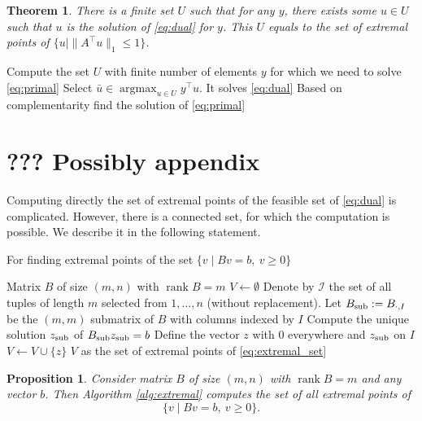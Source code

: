 \documentclass[journal]{IEEEtranTIE}
\newtheorem{theorem}[thm]{Theorem}
\newtheorem{proposition}[thm]{Proposition}
\theoremstyle{definition}
\newcommand{\argmax}{\operatorname{argmax}}
\newcommand{\norm}[1]{\|#1\|}
\newcommand{\rank}{\operatorname{rank}}
\begin{document}
\begin{theorem}
  There is a finite set $U$ such that for any $y$, there exists some $u\in U$ such that $u$ is the solution of \eqref{eq:dual} for $y$. This $U$ equals to the set of extremal points of $\{u\mid \norm{A^\top u}_1\le 1\}$.
\end{theorem}


\begin{algorithm}
\begin{algorithmic}[1]
  \Offline Compute the set $U$ with finite number of elements
  \Require $y$ for which we need to solve \eqref{eq:primal}
  \State Select $\bar u \in \argmax_{u\in U}y^\top u$. It solves \eqref{eq:dual}
  \State Based on complementarity find the solution of \eqref{eq:primal}
\end{algorithmic}
\end{algorithm}

\section{??? Possibly appendix}

Computing directly the set of extremal points of the feasible set of \eqref{eq:dual} is complicated. However, there is a connected set, for which the computation is possible. We describe it in the following statement.

\begin{algorithm}
\caption{For finding extremal points of the set $\{v\mid Bv=b,\ v\ge 0\}$}
\label{alg:extremal}
\begin{algorithmic}[1]
  \Require Matrix $B$ of size $(m,n)$ with $\rank B=m$
  \State $V\gets\emptyset$
  \State Denote by $\mathcal I$ the set of all tuples of length $m$ selected from $1,\dots,n$ (without replacement).
    \State Let $B_{\rm sub} := B_{\cdot,I}$ be the $(m,m)$ submatrix of $B$ with columns indexed by $I$
    \If{$\rank B_{\rm sub} = m$}
      \State Compute the unique solution $z_{\rm sub}$ of $B_{\rm sub}z_{\rm sub} = b$
        \State Define the vector $z$ with $0$ everywhere and $z_{\rm sub}$ on $I$
        \State $V\gets V\cup\{z\}$
      \EndIf              
    \EndIf
  \EndFor
  \Ensure $V$ as the set of extremal points of \eqref{eq:extremal_set}
\end{algorithmic}
\end{algorithm}





\begin{proposition}\label{prop:extremal}
  Consider matrix $B$ of size $(m,n)$ with $\rank B=m$ and any vector $b$. Then Algorithm \ref{alg:extremal} computes the set of all extremal points of
  \begin{equation}\label{eq:extremal_set}
    \{v\mid Bv=b,\ v\ge 0\}.
  \end{equation}
\end{proposition}
\end{document}
